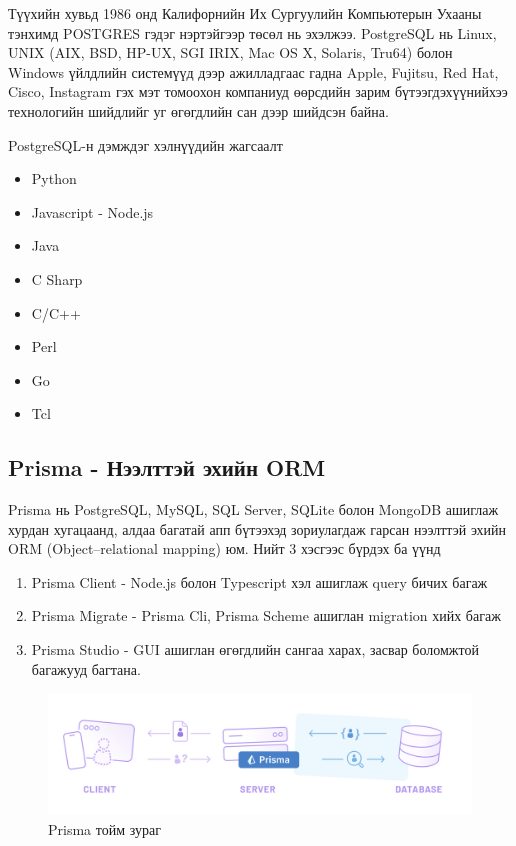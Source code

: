 Түүхийн хувьд 1986 онд Калифорнийн Их Сургуулийн Компьютерын Ухааны тэнхимд POSTGRES гэдэг нэртэйгээр төсөл нь эхэлжээ. PostgreSQL нь Linux, UNIX (AIX, BSD, HP-UX, SGI IRIX, Mac OS X, Solaris, Tru64) болон Windows үйлдлийн системүүд дээр ажилладгаас гадна Apple, Fujitsu, Red Hat, Cisco, Instagram гэх мэт томоохон компаниуд өөрсдийн зарим бүтээгдэхүүнийхээ технологийн шийдлийг уг өгөгдлийн сан дээр шийдсэн байна.

PostgreSQL-н дэмждэг хэлнүүдийн жагсаалт
\begin{itemize}
	\item Python
	\item Javascript - Node.js
	\item Java 
	\item C Sharp
	\item C/C++
	\item Perl
	\item Go 
	\item Tcl
\end{itemize}

\subsection{Prisma - Нээлттэй эхийн ORM}

Prisma нь PostgreSQL, MySQL, SQL Server, SQLite болон MongoDB ашиглаж хурдан хугацаанд, алдаа багатай апп бүтээхэд зориулагдаж гарсан нээлттэй эхийн ORM (Object–relational mapping) юм. Нийт 3 хэсгээс бүрдэх ба үүнд 

\begin{enumerate}
	\item Prisma Client - Node.js болон Typescript хэл ашиглаж query бичих багаж
	\item Prisma Migrate - Prisma Cli, Prisma Scheme ашиглан migration хийх багаж
	\item Prisma Studio - GUI ашиглан өгөгдлийн сангаа харах, засвар боломжтой багажууд багтана.
\end{enumerate}

\begin{figure}[h]
	\centering
	\includegraphics[width=15cm]{images/prisma-stack.png}
	\caption{Prisma тойм зураг}
	\label{fig:prisma}
\end{figure}

